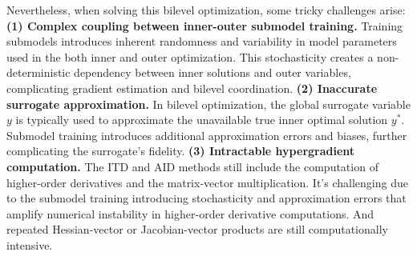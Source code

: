 \documentclass[lettersize,journal]{IEEEtran}
\begin{document}
Nevertheless, when solving this bilevel optimization, some tricky challenges arise:
\textbf{(1) Complex coupling between inner-outer submodel training.} Training submodels introduces inherent randomness and variability in model parameters used in the both inner and outer optimization. This stochasticity creates a non-deterministic dependency between inner solutions and outer variables, complicating gradient estimation and bilevel coordination. 
\textbf{(2) Inaccurate surrogate approximation.} In bilevel optimization, the global surrogate variable $y$ is typically used to approximate the unavailable true inner optimal solution $y^*$. Submodel training introduces additional approximation errors and biases, further complicating the surrogate’s fidelity.
\textbf{(3) Intractable hypergradient computation.} The ITD and AID methods still include the computation of higher-order derivatives and the matrix-vector multiplication. It's challenging due to the submodel training introducing stochasticity and approximation errors that amplify numerical instability in higher-order derivative computations. And repeated Hessian-vector or Jacobian-vector products are still computationally intensive.
\end{document}
